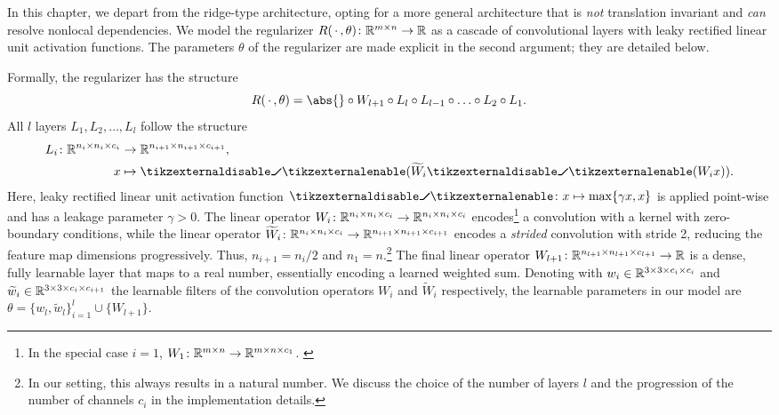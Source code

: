 In this chapter, we depart from the ridge-type architecture, opting for a more general architecture that is \emph{not} translation invariant and \emph{can} resolve nonlocal dependencies.
We model the regularizer \( R(\,\cdot\,, \theta) \colon \mathbb{R}^{m\times n} \to \mathbb{R} \) as a cascade of convolutional layers with leaky rectified linear unit activation functions.
The parameters \( \theta \) of the regularizer are made explicit in the second argument; they are detailed below.

Formally, the regularizer has the structure
\begin{equation}
	R(\argm, \theta) = \abs{} \circ W_{l+\num{1}} \circ L_l \circ L_{l-\num{1}} \circ \ldots \circ L_{\num{2}} \circ L_{\num{1}}.
	\label{eq:deep neural regularizer architecture}
\end{equation}
All \( l \) layers \( L_{\num{1}}, L_{\num{2}}, \dotsc, L_l \) follow the structure
\begin{equation}
	\begin{aligned}
		\map{L_i}{\R^{n_i \times n_i \times c_i}&}{\R^{n_{i + \num{1}} \times n_{i + \num{1}} \times c_{i + \num{1}}}},\\
		x &\mapsto \relu(\widetilde{W}_i \relu(W_i x)).
	\end{aligned}
\end{equation}
Here, leaky rectified linear unit activation function \( \relu \colon x \mapsto \max\{ \gamma x, x \} \) is applied point-wise and has a leakage parameter \( \gamma > \num{0} \).
The linear operator \( W_i \colon \mathbb{R}^{n_i \times n_i \times c_{i}} \to \mathbb{R}^{n_i \times n_i \times c_{i}} \) encodes\footnote{%
	In the special case \( i = \num{1} \), \( W_{\num{1}} \colon \mathbb{R}^{m\times n} \to \mathbb{R}^{m \times n \times c_{\num{1}}} \).
	\label{foot:special handling of first layer}
} a convolution with a  kernel with zero-boundary conditions, while the linear operator \( \widetilde{W}_i \colon \mathbb{R}^{n_i \times n_i \times c_{i}} \to \mathbb{R}^{n_{i + \num{1}} \times n_{i + \num{1}} \times c_{i+\num{1}}} \) encodes a \emph{strided} convolution with stride \num{2}, reducing the feature map dimensions progressively.
Thus, \( n_{i + \num{1}} = n_i / \num{2} \) and \( n_{\num{1}} = n \).\footnote{%
	In our setting, this always results in a natural number. We discuss the choice of the number of layers \( l \) and the progression of the number of channels \( c_i \) in the implementation details.
}
The final linear operator \( W_{l+\num{1}} \colon \mathbb{R}^{n_{l+\num{1}} \times n_{l + \num{1}} \times c_{l + \num{1}}} \to \mathbb{R} \) is a dense, fully learnable layer that maps to a real number, essentially encoding a learned weighted sum.
Denoting with \( w_i \in \mathbb{R}^{\num{3} \times \num{3} \times c_i \times c_i} \) and \( \widetilde{w}_i \in \mathbb{R}^{\num{3} \times \num{3} \times c_i \times c_{i + \num{1}}} \) the learnable filters of the convolution operators \( W_i \) and \( \widetilde{W}_i \) respectively, the learnable parameters in our model are \( \theta = {\{ w_l, \widetilde{w}_l \}}_{i=\num{1}}^l \cup \{ W_{l+1} \} \).

